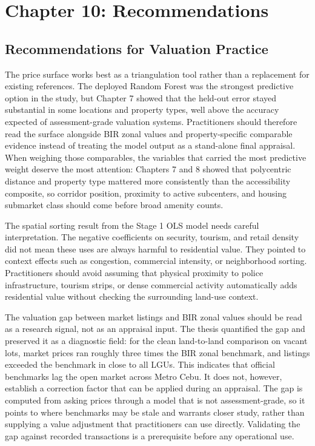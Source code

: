 \section{Chapter 10: Recommendations}\label{recommendations}

\subsection{Recommendations for Valuation Practice}\label{recommendations-for-valuation-practice}

The price surface works best as a triangulation tool rather than a replacement for existing references. The deployed Random Forest was the strongest predictive option in the study, but Chapter 7 showed that the held-out error stayed substantial in some locations and property types, well above the accuracy expected of assessment-grade valuation systems. Practitioners should therefore read the surface alongside BIR zonal values and property-specific comparable evidence instead of treating the model output as a stand-alone final appraisal. When weighing those comparables, the variables that carried the most predictive weight deserve the most attention: Chapters 7 and 8 showed that polycentric distance and property type mattered more consistently than the accessibility composite, so corridor position, proximity to active subcenters, and housing submarket class should come before broad amenity counts.

The spatial sorting result from the Stage 1 OLS model needs careful interpretation. The negative coefficients on security, tourism, and retail density did not mean these uses are always harmful to residential value. They pointed to context effects such as congestion, commercial intensity, or neighborhood sorting. Practitioners should avoid assuming that physical proximity to police infrastructure, tourism strips, or dense commercial activity automatically adds residential value without checking the surrounding land-use context.

The valuation gap between market listings and BIR zonal values should be read as a research signal, not as an appraisal input. The thesis quantified the gap and preserved it as a diagnostic field: for the clean land-to-land comparison on vacant lots, market prices ran roughly three times the BIR zonal benchmark, and listings exceeded the benchmark in close to all LGUs. This indicates that official benchmarks lag the open market across Metro Cebu. It does not, however, establish a correction factor that can be applied during an appraisal. The gap is computed from asking prices through a model that is not assessment-grade, so it points to where benchmarks may be stale and warrants closer study, rather than supplying a value adjustment that practitioners can use directly. Validating the gap against recorded transactions is a prerequisite before any operational use.

